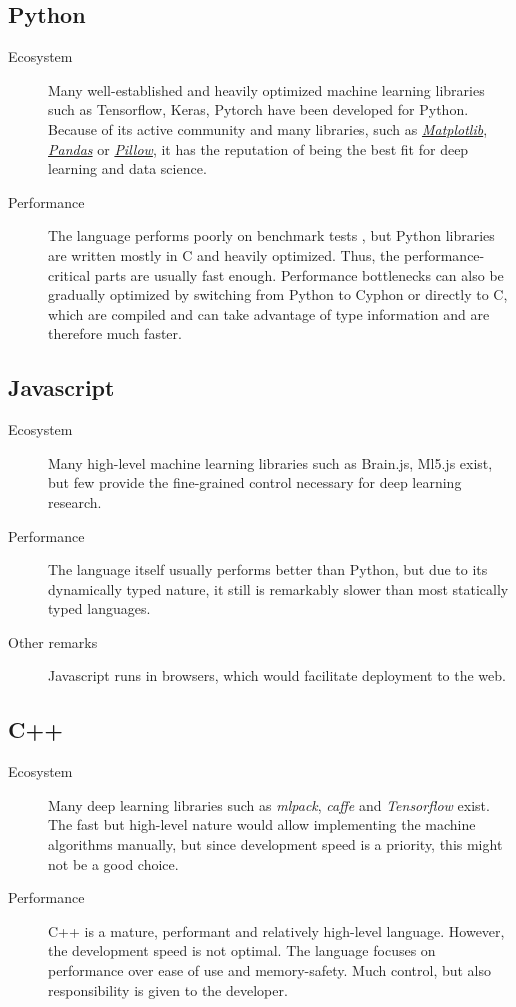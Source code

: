 \documentclass[12pt, a4paper, titlepage]{report}
\let\oldhref\href
\renewcommand{\href}[2]{\oldhref{#1}{\itshape#2}}
\begin{document}
\vspace{0.5cm}
{
   \center
   \subsection*{Python}
}
\begin{description}
   \item[Ecosystem] Many well-established and heavily optimized machine learning libraries such as Tensorflow, Keras, Pytorch have been developed for Python. Because of its active community and many libraries, such as \href{}{Matplotlib}, \href{}{Pandas} or \href{}{Pillow}, it has the reputation of being the best fit for deep learning and data science.
   \item[Performance] The language performs poorly on benchmark tests \cite{goodmanwen_programming-language-benchmarks-visualization_2023}, but Python libraries are written mostly in C and heavily optimized. Thus, the performance-critical parts are usually fast enough. Performance bottlenecks can also be gradually optimized by switching from Python to Cyphon or directly to C, which are compiled and can take advantage of type information and are therefore much faster.
\end{description}

{
   \center
   \subsection*{Javascript}
}
\begin{description}
   \item[Ecosystem] Many high-level machine learning libraries such as Brain.js, Ml5.js exist, but few provide the fine-grained control necessary for deep learning research.
   \item[Performance] The language itself usually performs better than Python, but due to its dynamically typed nature, it still is remarkably slower than most statically typed languages.
   \item[Other remarks] Javascript runs in browsers, which would facilitate deployment to the web.
\end{description}

{
   \center
   \subsection*{C++}
}
\begin{description}
   \item[Ecosystem] Many deep learning libraries such as \emph{mlpack}, \emph{caffe} and \emph{Tensorflow} exist. The fast but high-level nature would allow implementing the machine algorithms manually, but since development speed is a priority, this might not be a good choice.
   \item[Performance] C++ is a mature, performant and relatively high-level language. However, the development speed is not optimal. The language focuses on performance over ease of use and memory-safety. Much control, but also responsibility is given to the developer.
\end{description}
\end{document}
